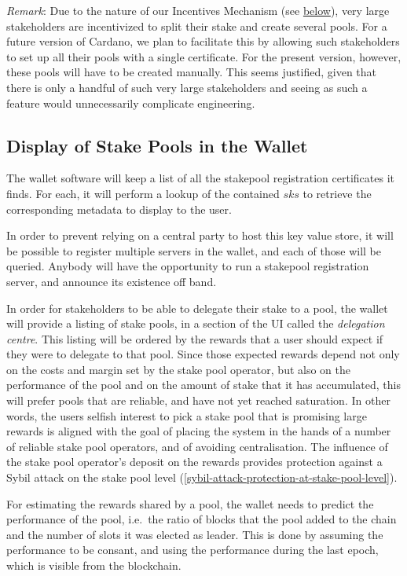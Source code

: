 \documentclass[11pt,a4paper]{article}
\begin{document}
\emph{Remark}: Due to the nature of our Incentives Mechanism (see
\hyperref[design-of-incentives]{below}), very large stakeholders are
incentivized to split their stake and create several pools. For a future
version of Cardano, we plan to facilitate this by allowing such
stakeholders to set up all their pools with a single certificate. For
the present version, however, these pools will have to be created
manually. This seems justified, given that there is only a handful of
such very large stakeholders and seeing as such a feature would
unnecessarily complicate engineering.

\subsection{Display of Stake Pools in the
Wallet}\label{display-of-stake-pools-in-the-wallet}

The wallet software will keep a list of all the stakepool registration
certificates it finds. For each, it will perform a lookup of the
contained \(sks\) to retrieve the corresponding metadata to display to
the user.

In order to prevent relying on a central party to host this key value
store, it will be possible to register multiple servers in the wallet,
and each of those will be queried. Anybody will have the opportunity to
run a stakepool registration server, and announce its existence off
band.

In order for stakeholders to be able to delegate their stake to a pool,
the wallet will provide a listing of stake pools, in a section of the UI
called the \emph{delegation centre}. This listing will be ordered by the
rewards that a user should expect if they were to delegate to that pool.
Since those expected rewards depend not only on the costs and margin set
by the stake pool operator, but also on the performance of the pool and
on the amount of stake that it has accumulated, this will prefer pools
that are reliable, and have not yet reached saturation. In other words,
the users selfish interest to pick a stake pool that is promising large
rewards is aligned with the goal of placing the system in the hands of a
number of reliable stake pool operators, and of avoiding centralisation.
The influence of the stake pool operator's deposit on the rewards
provides protection against a Sybil attack on the stake pool level
(\ref{sybil-attack-protection-at-stake-pool-level}).

For estimating the rewards shared by a pool, the wallet needs to predict
the performance of the pool, i.e.~the ratio of blocks that the pool
added to the chain and the number of slots it was elected as leader.
This is done by assuming the performance to be consant, and using the
performance during the last epoch, which is visible from the blockchain.
\end{document}
